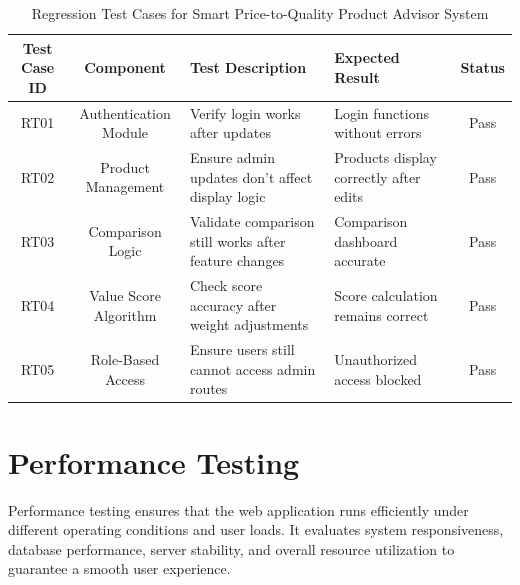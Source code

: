 \begin{table}[H]
    \centering
    \renewcommand{\arraystretch}{1.3}
    \small
    \begin{tabular}{|c|c|p{3cm}|p{3cm}|c|}
        \hline
        \textbf{Test Case ID} & \textbf{Component} & \textbf{Test Description} & \textbf{Expected Result} & \textbf{Status} \\
        \hline
        RT01 & Authentication Module & Verify login works after updates & Login functions without errors & Pass \\
        \hline
        RT02 & Product Management & Ensure admin updates don’t affect display logic & Products display correctly after edits & Pass \\
        \hline
        RT03 & Comparison Logic & Validate comparison still works after feature changes & Comparison dashboard accurate & Pass \\
        \hline
        RT04 & Value Score Algorithm & Check score accuracy after weight adjustments & Score calculation remains correct & Pass \\
        \hline
        RT05 & Role-Based Access & Ensure users still cannot access admin routes & Unauthorized access blocked & Pass \\
        \hline
    \end{tabular}
    \caption{Regression Test Cases for Smart Price-to-Quality Product Advisor System}
    \label{tab:regression_tests}
\end{table}

\newpage
\section{Performance Testing}

Performance testing ensures that the web application runs efficiently under different operating conditions and user loads. It evaluates system responsiveness, database performance, server stability, and overall resource utilization to guarantee a smooth user experience.


